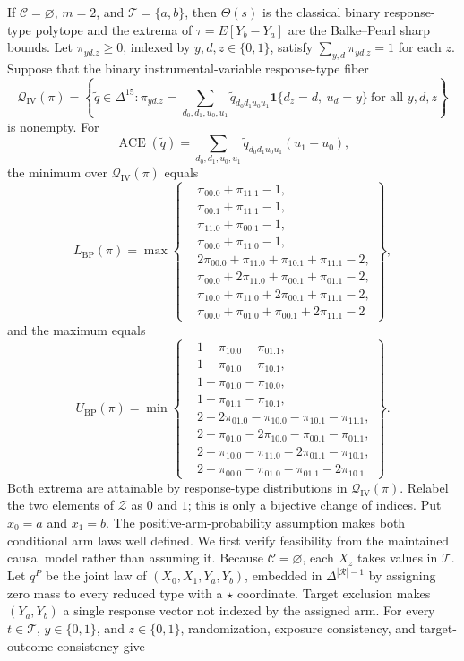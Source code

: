 If \(\mathcal C=\varnothing\), \(m=2\), and \(\mathcal T=\{a,b\}\), then \(\Theta(s)\) is the classical binary response-type polytope and the extrema of \(\tau=E[Y_b-Y_a]\) are the Balke--Pearl sharp bounds.
Let \(\pi_{yd.z}\ge 0\), indexed by \(y,d,z\in\{0,1\}\), satisfy \(\sum_{y,d}\pi_{yd.z}=1\) for each \(z\). Suppose that the binary instrumental-variable response-type fiber
\[
 \mathcal Q_{\mathrm{IV}}(\pi)
 =\left\{\widetilde q\in\Delta^{15}:
 \pi_{yd.z}=\sum_{d_0,d_1,u_0,u_1}\widetilde q_{d_0d_1u_0u_1}
 \mathbf 1\{d_z=d,\ u_d=y\}\ \text{for all }y,d,z\right\}
\]
is nonempty. For
\[
 \operatorname{ACE}(\widetilde q)
 =\sum_{d_0,d_1,u_0,u_1}\widetilde q_{d_0d_1u_0u_1}(u_1-u_0),
\]
the minimum over \(\mathcal Q_{\mathrm{IV}}(\pi)\) equals
\[
L_{\mathrm{BP}}(\pi)=\max\left\{
\begin{aligned}
&\pi_{00.0}+\pi_{11.1}-1,\\
&\pi_{00.1}+\pi_{11.1}-1,\\
&\pi_{11.0}+\pi_{00.1}-1,\\
&\pi_{00.0}+\pi_{11.0}-1,\\
&2\pi_{00.0}+\pi_{11.0}+\pi_{10.1}+\pi_{11.1}-2,\\
&\pi_{00.0}+2\pi_{11.0}+\pi_{00.1}+\pi_{01.1}-2,\\
&\pi_{10.0}+\pi_{11.0}+2\pi_{00.1}+\pi_{11.1}-2,\\
&\pi_{00.0}+\pi_{01.0}+\pi_{00.1}+2\pi_{11.1}-2
\end{aligned}\right\},
\]
and the maximum equals
\[
U_{\mathrm{BP}}(\pi)=\min\left\{
\begin{aligned}
&1-\pi_{10.0}-\pi_{01.1},\\
&1-\pi_{01.0}-\pi_{10.1},\\
&1-\pi_{01.0}-\pi_{10.0},\\
&1-\pi_{01.1}-\pi_{10.1},\\
&2-2\pi_{01.0}-\pi_{10.0}-\pi_{10.1}-\pi_{11.1},\\
&2-\pi_{01.0}-2\pi_{10.0}-\pi_{00.1}-\pi_{01.1},\\
&2-\pi_{10.0}-\pi_{11.0}-2\pi_{01.1}-\pi_{10.1},\\
&2-\pi_{00.0}-\pi_{01.0}-\pi_{01.1}-2\pi_{10.1}
\end{aligned}\right\}.
\]
Both extrema are attainable by response-type distributions in \(\mathcal Q_{\mathrm{IV}}(\pi)\).
Relabel the two elements of \(\mathcal Z\) as \(0\) and \(1\); this is only a bijective change of indices. Put \(x_0=a\) and \(x_1=b\). The positive-arm-probability assumption makes both conditional arm laws well defined. We first verify feasibility from the maintained causal model rather than assuming it. Because \(\mathcal C=\varnothing\), each \(X_z\) takes values in \(\mathcal T\). Let \(q^P\) be the joint law of \((X_0,X_1,Y_a,Y_b)\), embedded in \(\Delta^{|\mathcal R|-1}\) by assigning zero mass to every reduced type with a \(\star\) coordinate. Target exclusion makes \((Y_a,Y_b)\) a single response vector not indexed by the assigned arm. For every \(t\in\mathcal T\), \(y\in\{0,1\}\), and \(z\in\{0,1\}\), randomization, exposure consistency, and target-outcome consistency give
